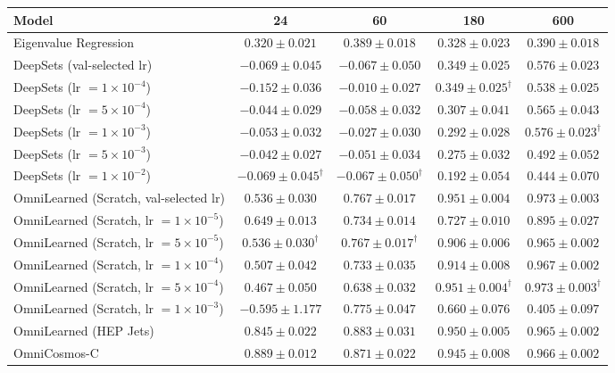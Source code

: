 {\setlength{\tabcolsep}{4pt}\small
\begin{tabular}{lcccc}
\toprule
Model & 24 & 60 & 180 & 600 \\
\midrule
Eigenvalue Regression & $0.320 \pm 0.021$ & $0.389 \pm 0.018$ & $0.328 \pm 0.023$ & $0.390 \pm 0.018$ \\
\cmidrule(lr){1-5}
DeepSets (val-selected lr) & $-0.069 \pm 0.045$ & $-0.067 \pm 0.050$ & $0.349 \pm 0.025$ & $0.576 \pm 0.023$ \\
DeepSets (lr $= 1\times10^{-4}$) & $-0.152 \pm 0.036$ & $-0.010 \pm 0.027$ & $0.349 \pm 0.025^\dagger$ & $0.538 \pm 0.025$ \\
DeepSets (lr $= 5\times10^{-4}$) & $-0.044 \pm 0.029$ & $-0.058 \pm 0.032$ & $0.307 \pm 0.041$ & $0.565 \pm 0.043$ \\
DeepSets (lr $= 1\times10^{-3}$) & $-0.053 \pm 0.032$ & $-0.027 \pm 0.030$ & $0.292 \pm 0.028$ & $0.576 \pm 0.023^\dagger$ \\
DeepSets (lr $= 5\times10^{-3}$) & $-0.042 \pm 0.027$ & $-0.051 \pm 0.034$ & $0.275 \pm 0.032$ & $0.492 \pm 0.052$ \\
DeepSets (lr $= 1\times10^{-2}$) & $-0.069 \pm 0.045^\dagger$ & $-0.067 \pm 0.050^\dagger$ & $0.192 \pm 0.054$ & $0.444 \pm 0.070$ \\
\cmidrule(lr){1-5}
OmniLearned (Scratch, val-selected lr) & $0.536 \pm 0.030$ & $0.767 \pm 0.017$ & $0.951 \pm 0.004$ & $0.973 \pm 0.003$ \\
OmniLearned (Scratch, lr $= 1\times10^{-5}$) & $0.649 \pm 0.013$ & $0.734 \pm 0.014$ & $0.727 \pm 0.010$ & $0.895 \pm 0.027$ \\
OmniLearned (Scratch, lr $= 5\times10^{-5}$) & $0.536 \pm 0.030^\dagger$ & $0.767 \pm 0.017^\dagger$ & $0.906 \pm 0.006$ & $0.965 \pm 0.002$ \\
OmniLearned (Scratch, lr $= 1\times10^{-4}$) & $0.507 \pm 0.042$ & $0.733 \pm 0.035$ & $0.914 \pm 0.008$ & $0.967 \pm 0.002$ \\
OmniLearned (Scratch, lr $= 5\times10^{-4}$) & $0.467 \pm 0.050$ & $0.638 \pm 0.032$ & $0.951 \pm 0.004^\dagger$ & $0.973 \pm 0.003^\dagger$ \\
OmniLearned (Scratch, lr $= 1\times10^{-3}$) & $-0.595 \pm 1.177$ & $0.775 \pm 0.047$ & $0.660 \pm 0.076$ & $0.405 \pm 0.097$ \\
\midrule
OmniLearned (HEP Jets) & $0.845 \pm 0.022$ & $0.883 \pm 0.031$ & $0.950 \pm 0.005$ & $0.965 \pm 0.002$ \\
OmniCosmos-C & $0.889 \pm 0.012$ & $0.871 \pm 0.022$ & $0.945 \pm 0.008$ & $0.966 \pm 0.002$ \\

\end{tabular}}
